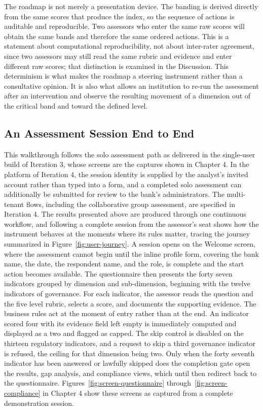 The roadmap is not merely a presentation device. The banding is derived directly from the same scores that produce the index, so the sequence of actions is auditable and reproducible. Two assessors who enter the same raw scores will obtain the same bands and therefore the same ordered actions. This is a statement about computational reproducibility, not about inter-rater agreement, since two assessors may still read the same rubric and evidence and enter different raw scores; that distinction is examined in the Discussion. This determinism is what makes the roadmap a steering instrument rather than a consultative opinion. It is also what allows an institution to re-run the assessment after an intervention and observe the resulting movement of a dimension out of the critical band and toward the defined level.

\subsection{An Assessment Session End to End}

This walkthrough follows the solo assessment path as delivered in the single-user build of Iteration 3, whose screens are the captures shown in Chapter 4. In the platform of Iteration 4, the session identity is supplied by the analyst's invited account rather than typed into a form, and a completed solo assessment can additionally be submitted for review to the bank's administrators. The multi-tenant flows, including the collaborative group assessment, are specified in Iteration 4. The results presented above are produced through one continuous workflow, and following a complete session from the assessor's seat shows how the instrument behaves at the moments where its rules matter, tracing the journey summarized in Figure~\ref{fig:user-journey}. A session opens on the Welcome screen, where the assessment cannot begin until the inline profile form, covering the bank name, the date, the respondent name, and the role, is complete and the start action becomes available. The questionnaire then presents the forty seven indicators grouped by dimension and sub-dimension, beginning with the twelve indicators of governance. For each indicator, the assessor reads the question and the five level rubric, selects a score, and documents the supporting evidence. The business rules act at the moment of entry rather than at the end. An indicator scored four with its evidence field left empty is immediately computed and displayed as a two and flagged as capped. The skip control is disabled on the thirteen regulatory indicators, and a request to skip a third governance indicator is refused, the ceiling for that dimension being two. Only when the forty seventh indicator has been answered or lawfully skipped does the completion gate open the results, gap analysis, and compliance views, which until then redirect back to the questionnaire. Figures~\ref{fig:screen-questionnaire} through~\ref{fig:screen-compliance} in Chapter 4 show these screens as captured from a complete demonstration session.

